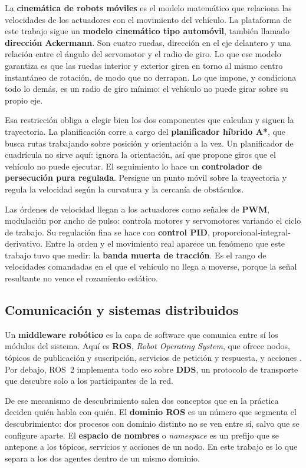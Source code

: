 La \textbf{cinemática de robots móviles} es el modelo matemático que relaciona
las velocidades de los actuadores con el movimiento del vehículo. La plataforma
de este trabajo sigue un \textbf{modelo cinemático tipo automóvil}, también
llamado \textbf{dirección Ackermann}. Son cuatro ruedas, dirección en el eje
delantero y una relación entre el ángulo del servomotor y el radio de giro. Lo
que ese modelo garantiza es que las ruedas interior y exterior giren en torno al
mismo centro instantáneo de rotación, de modo que no derrapan. Lo que impone, y
condiciona todo lo demás, es un radio de giro mínimo: el vehículo no puede girar
sobre su propio eje.

Esa restricción obliga a elegir bien los dos componentes que calculan y siguen la
trayectoria. La planificación corre a cargo del \textbf{planificador híbrido A*},
que busca rutas trabajando sobre posición y orientación a la vez. Un planificador
de cuadrícula no sirve aquí: ignora la orientación, así que propone giros que el
vehículo no puede ejecutar. El seguimiento lo hace un \textbf{controlador de
persecución pura regulada}. Persigue un punto móvil sobre la trayectoria y regula
la velocidad según la curvatura y la cercanía de obstáculos.

Las órdenes de velocidad llegan a los actuadores como señales de \textbf{PWM},
modulación por ancho de pulso: controla motores y servomotores variando el ciclo
de trabajo. Su regulación fina se hace con \textbf{control PID},
proporcional-integral-derivativo. Entre la orden y el movimiento real aparece un
fenómeno que este trabajo tuvo que medir: la \textbf{banda muerta de tracción}.
Es el rango de velocidades comandadas en el que el vehículo no llega a moverse,
porque la señal resultante no vence el rozamiento estático.

\subsection{Comunicación y sistemas distribuidos}

Un \textbf{middleware robótico} es la capa de software que comunica entre sí los
módulos del sistema. Aquí es \textbf{ROS}, \textit{Robot Operating System}, que
ofrece nodos, tópicos de publicación y suscripción, servicios de petición y
respuesta, y acciones \autocite{macenski2022ros2}. Por debajo, ROS~2 implementa
todo eso sobre \textbf{DDS}, un protocolo de transporte que descubre solo a los
participantes de la red.

De ese mecanismo de descubrimiento salen dos conceptos que en la práctica deciden
quién habla con quién. El \textbf{dominio ROS} es un número que segmenta el
descubrimiento: dos procesos con dominio distinto no se ven entre sí, salvo que
se configure aparte. El \textbf{espacio de nombres} o \textit{namespace} es un
prefijo que se antepone a los tópicos, servicios y acciones de un nodo. En este
trabajo es lo que separa a los dos agentes dentro de un mismo dominio.

